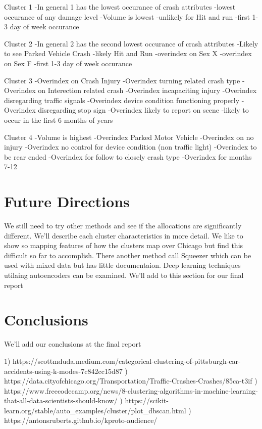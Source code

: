 \documentclass[conference]{IEEEtran}
\begin{document}
Cluster 1
-In general 1 has the lowest occurance of crash attributes
-lowest occurance of any damage level
-Volume is lowest
-unlikely for Hit and run
-first 1-3 day of week occurance

Cluster 2
-In general 2 has the second lowest occurance of crash attributes
-Likely to see Parked Vehicle Crash
-likely Hit and Run
-overindex on Sex X
-overindex on Sex F
-first 1-3 day of week occurance

Cluster 3
-Overindex on Crash Injury
-Overindex turning related crash type
-Overindex on Interection related crash
-Overindex incapaciting injury
-Overindex disregarding traffic signals
-Overindex device condition functioning properly
-Overindex disregarding stop sign
-Overindex likely to report on scene
-likely to occur in the first 6 months of years

Cluster 4
-Volume is highest
-Overindex Parked Motor Vehicle
-Overindex on no injury
-Overindex no control for device condition (non traffic light)
-Overindex to be rear ended
-Overindex for follow to closely crash type
-Overindex for months 7-12



\section{Future Directions}
We still need to try other methods and see if the allocations are significantly different.  We'll describe each cluster characteristics in more detail.
We like to show so mapping features of how the clusters map over Chicago but find this difficult so far to accomplish.  There another method call Squeezer which can be used with mixed data but has little documentaion.  Deep learning techniques utilaing autoencoders can be examined.  We'll add to this section for our final report

\section{Conclusions}
We'll add our conclusions at the final report
 



1) https://scottmduda.medium.com/categorical-clustering-of-pittsburgh-car-accidents-using-k-modes-7c842cc15d87 ) https://data.cityofchicago.org/Transportation/Traffic-Crashes-Crashes/85ca-t3if ) https://www.freecodecamp.org/news/8-clustering-algorithms-in-machine-learning-that-all-data-scientists-should-know/  ) https://scikit-learn.org/stable/auto_examples/cluster/plot_dbscan.html ) https://antonsruberts.github.io/kproto-audience/ \linebreak
\end{document}
